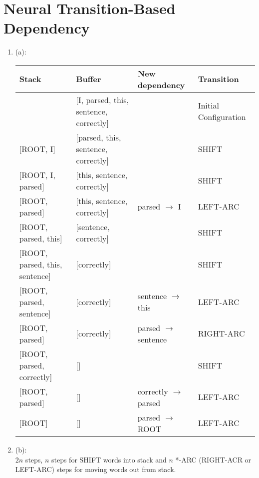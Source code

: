 \documentclass[a4paper]{article}
\begin{document}
\section{Neural Transition-Based Dependency}
\begin{enumerate}
	\item (a):\\
	\begin{tabular}{l|l|l|l}
	Stack & Buffer & New dependency & Transition\\
	\hline
	[ROOT] & [I, parsed, this, sentence, correctly] &   & Initial Configuration \\

	[ROOT, I] & [parsed, this, sentence, correctly] &  & SHIFT \\

	[ROOT, I, parsed] & [this, sentence, correctly] &  & SHIFT \\

	[ROOT, parsed] & [this, sentence, correctly] &parsed $\rightarrow$ I & LEFT-ARC \\

	[ROOT, parsed, this] & [sentence, correctly] & & SHIFT \\

	[ROOT, parsed, this, sentence] & [correctly] & & SHIFT \\

	[ROOT, parsed, sentence] & [correctly] &sentence $\rightarrow$ this & LEFT-ARC \\

	[ROOT, parsed] & [correctly] &parsed $\rightarrow$ sentence & RIGHT-ARC \\

	[ROOT, parsed, correctly] & [] & & SHIFT \\

	[ROOT, parsed] & [] &correctly $\rightarrow$ parsed & LEFT-ARC \\

	[ROOT] & [] &parsed $\rightarrow$ ROOT & LEFT-ARC \\
	\end{tabular}

	\item (b):\\
	$2n$ steps, $n$ steps for SHIFT words into stack and $n$ *-ARC (RIGHT-ACR or LEFT-ARC) steps for moving words out from stack.
\end{enumerate}
\end{document}
